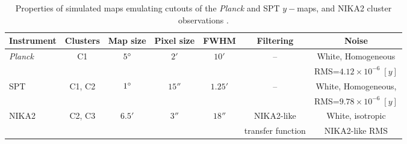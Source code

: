 \begin{table}[t]
    \centering
    \begin{tabular}{l c c c c c c}
        \toprule
        Instrument & Clusters & Map size & Pixel size & FWHM & Filtering & Noise \\
        \midrule
        \multirow{2}{*}{\textit{Planck}} & \multirow{2}{*}{C1} & \multirow{2}{*}{$5\degree$} & \multirow{2}{*}{$2'$} & \multirow{2}{*}{$10'$} & \multirow{2}{*}{--} & White, Homogeneous \\
            & & & & & & RMS=$4.12 \times 10^{-6} \; [y]$ \\
        \midrule
        \multirow{2}{*}{SPT} & \multirow{2}{*}{C1, C2} & \multirow{2}{*}{$1\degree$} & \multirow{2}{*}{$15''$} & \multirow{2}{*}{$1.25'$} & -- & White, Homogeneous, \\
            & & & & & & RMS=$9.78 \times 10^{-6} \; [y]$ \\
        \midrule
        \multirow{2}{*}{NIKA2} & \multirow{2}{*}{C2, C3} & \multirow{2}{*}{$6.5'$} & \multirow{2}{*}{$3''$} & \multirow{2}{*}{$18''$} & NIKA2-like & White, isotropic \\
                               & & & & & transfer function & NIKA2-like RMS \\
        \bottomrule
    \end{tabular}
    \caption{\normalfont
        Properties of simulated maps emulating cutouts of the \textit{Planck} \citep{planck_collaboration_planck_2016} and SPT \citep{bleem_cmbksz_2022} $y-$maps, and NIKA2 cluster observations \citep{keruzore_exploiting_2020}.
    }
    \label{tab:simu:map_props}
\end{table}


